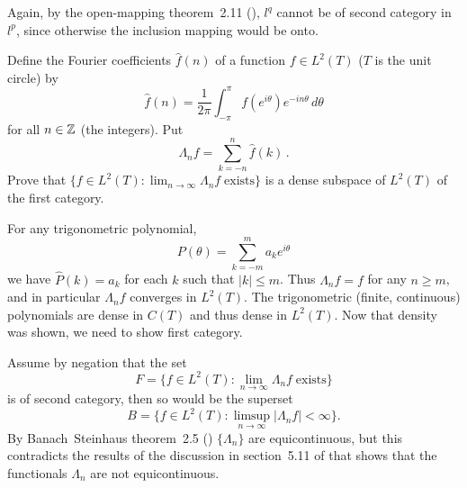 \begin{enumerate}
\begin{itemize}
  Again, by the open-mapping theorem~2.11 (\cite{RudinFA79}), 
  \(l^q\) cannot be of second category
  in \(l^p\), since otherwise the inclusion mapping would be onto.

\end{itemize}



\begin{excopy}
Define the Fourier coefficients \(\hat{f}(n)\) of a function
\(f\in L^2(T)\) ($T$ is the unit circle) by
\begin{equation*}
\hat{f}(n) 
 = \frac{1}{2\pi} \int_{-\pi}^{\pi} f(e^{i\theta})e^{-in\theta}\,d\theta
\end{equation*}
for all \(n\in\mathbb{Z}\) (the integers). Put
\begin{equation*}
 \Lambda_n f = \sum_{k= -n}^n \hat{f}(k)\,.
\end{equation*}
Prove that 
 \(\{f\in L^2(T): \lim_{n\to\infty} \Lambda_n f\; \textrm{exists}\}\)
is a dense subspace of \(L^2(T)\) of the first category.
\end{excopy}

For any trigonometric polynomial, 
\begin{equation*}
 P(\theta) = \sum_{k= -m}^m a_k e^{i\theta}
\end{equation*}
we have \(\hat{P}(k) = a_k\)
for each $k$ such that \(|k| \leq m\).
Thus \(\Lambda_n f = f\) for any \(n\geq m\), 
and in particular \(\Lambda_n f\) converges in  \(L^2(T)\).
The trigonometric (finite, continuous) polynomials
are dense in \(C(T)\) and thus dense in \(L^2(T)\).
Now that density was shown, we need to show first category.

Assume by negation that the set 
\begin{equation*}
F = \{f\in L^2(T): \lim_{n\to\infty} \Lambda_n f\; \textrm{exists}\}
\end{equation*}
is of second category, then so would be the superset
\begin{equation*}
B = \{f\in L^2(T): \limsup_{n\to\infty} |\Lambda_n f| < \infty\}.
\end{equation*}
By
Banach~Steinhaus theorem~2.5 (\cite{RudinFA79})
\(\{\Lambda_n\}\) are equicontinuous, but this contradicts
the results of the 
discussion in section~5.11 of \cite{RudinRCA80} that shows that 
the functionals \(\Lambda_n\) are not equicontinuous.



\end{enumerate}
